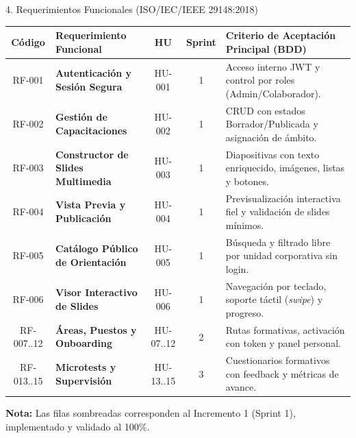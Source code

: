 \documentclass[aspectratio=169, 10pt, spanish]{beamer}
\begin{document}
\begin{frame}{4. Requerimientos Funcionales (ISO/IEC/IEEE 29148:2018)}
\begin{center}
\scriptsize
\renewcommand{\arraystretch}{1.10}
\begin{tabularx}{\textwidth}{c>{\bfseries}p{3.2cm}ccX}
\toprule
\textbf{Código} & \textbf{Requerimiento Funcional} & \textbf{HU} & \textbf{Sprint} & \textbf{Criterio de Aceptación Principal (BDD)} \\
\midrule
\rowcolor{unsaacLight}
RF-001 & Autenticación y Sesión Segura & HU-001 & 1 & Acceso interno JWT y control por roles (Admin/Colaborador). \\
\rowcolor{unsaacLight}
RF-002 & Gestión de Capacitaciones & HU-002 & 1 & CRUD con estados Borrador/Publicada y asignación de ámbito. \\
\rowcolor{unsaacLight}
RF-003 & Constructor de Slides Multimedia & HU-003 & 1 & Diapositivas con texto enriquecido, imágenes, listas y botones. \\
\rowcolor{unsaacLight}
RF-004 & Vista Previa y Publicación & HU-004 & 1 & Previsualización interactiva fiel y validación de slides mínimos. \\
\rowcolor{unsaacLight}
RF-005 & Catálogo Público de Orientación & HU-005 & 1 & Búsqueda y filtrado libre por unidad corporativa sin login. \\
\rowcolor{unsaacLight}
RF-006 & Visor Interactivo de Slides & HU-006 & 1 & Navegación por teclado, soporte táctil (\textit{swipe}) y progreso. \\
\midrule
RF-007..12 & Áreas, Puestos y Onboarding & HU-07..12 & 2 & Rutas formativas, activación con token y panel personal. \\
RF-013..15 & Microtests y Supervisión & HU-13..15 & 3 & Cuestionarios formativos con feedback y métricas de avance. \\
\bottomrule
\end{tabularx}
\end{center}
\vspace{-1mm}
{\tiny \textbf{Nota:} Las filas sombreadas corresponden al Incremento 1 (Sprint 1), implementado y validado al 100\%.}
\end{frame}
\end{document}
